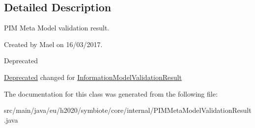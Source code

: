 \subsection{Detailed Description}
P\+IM Meta Model validation result.

Created by Mael on 16/03/2017.

\begin{DoxyRefDesc}{Deprecated}
\item[\hyperlink{deprecated__deprecated000004}{Deprecated}]changed for \hyperlink{classeu_1_1h2020_1_1symbiote_1_1core_1_1internal_1_1InformationModelValidationResult}{Information\+Model\+Validation\+Result} \end{DoxyRefDesc}


The documentation for this class was generated from the following file\+:\begin{DoxyCompactItemize}
\item 
src/main/java/eu/h2020/symbiote/core/internal/P\+I\+M\+Meta\+Model\+Validation\+Result.\+java\end{DoxyCompactItemize}

